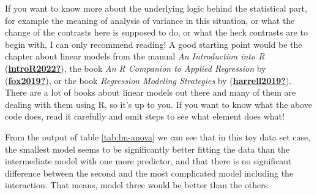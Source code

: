 \documentclass[
  11pt,
  a4paper,
  twoside]{scrbook}
\begin{document}
\linespread{1}

\begin{table}[H]

\caption{\label{tab:lm-anova}Analysis of variance table for three linear models}
\centering
{}
\end{table}

If you want to know more about the underlying logic behind the statistical part, for example the meaning of analysis of variance in this situation, or what the change of the contrasts here is supposed to do, or what the heck contrasts are to begin with, I can only recommend reading! A good starting point would be the chapter about linear models from the manual \emph{An Introduction into R} (\protect\hyperlink{ref-introR2022}{\textbf{introR2022?}}), the book \emph{An R Companion to Applied Regression} by (\protect\hyperlink{ref-fox2019}{\textbf{fox2019?}}), or the book \emph{Regression Modeling Strategies} by (\protect\hyperlink{ref-harrell2019}{\textbf{harrell2019?}}). There are a lot of books about linear models out there and many of them are dealing with them using R, so it's up to you. If you want to know what the above code does, read it carefully and omit steps to see what element does what!

From the output of table \ref{tab:lm-anova} we can see that in this toy data set case, the smallest model seems to be significantly better fitting the data than the intermediate model with one more predictor, and that there is no significant difference between the second and the most complicated model including the interaction. That means, model three would be better than the others.
\end{document}
